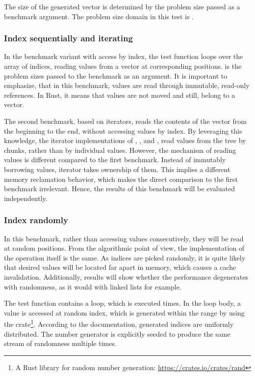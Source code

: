 The size of the generated vector is determined by the problem size passed as a benchmark argument. The problem size domain in this test is \range{[10, 1m]}.

\subsubsection*{Index sequentially and iterating}
In the benchmark variant with access by index, the test function loops over the array of \range{[0, N)} indices, reading values from a vector at corresponding positions. \n{} is the problem sizes passed to the benchmark as an argument. It is important to emphasize, that in this benchmark, values are read through immutable, read-only references. In Rust, it means that values are not moved and still, belong to a vector.

The second benchmark, based on iterators, reads the contents of the vector from the beginning to the end, without accessing values by index. By leveraging this knowledge, the iterator implementations of \rbvec{}, \rrbvec{}, and \pvec{}, read values from the tree by chunks, rather than by individual values. However, the mechanism of reading values is different compared to the first benchmark. Instead of immutably borrowing values, iterator takes ownership of them. This implies a different memory reclamation behavior, which makes the direct comparison to the first benchmark irrelevant. Hence, the results of this benchmark will be evaluated independently.

\subsubsection*{Index randomly}
In this benchmark, rather than accessing values consecutively, they will be read at random positions. From the algorithmic point of view, the implementation of the operation itself is the same. As indices are picked randomly, it is quite likely that desired values will be located far apart in memory, which causes a cache invalidation. Additionally, results will show whether the performance degenerates with randomness, as it would with linked lists for example.

The test function contains a loop, which is executed \n{} times. In the loop body, a value is accessed at random index, which is generated within the \range{[0, N)} range by using the  crate\footnote{A Rust library for random number generation: \url{https://crates.io/crates/rand}}. According to the  documentation, generated indices are uniformly distributed. The number generator is explicitly seeded to produce the same stream of randomness multiple times.

